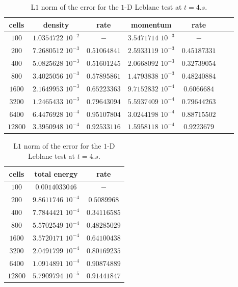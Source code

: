 \documentclass[preprint,10pt]{elsarticle}
\begin{document}
\begin{table}[H]
\begin{center}
 \caption{\label{tbl:l1_norm_leblanc} L$1$ norm of the error for the $1$-D Leblanc test at $t=4.s$.}
 \begin{tabular}{|c|c|c|c|c|c|c|}
 \hline
   cells & density & rate & momentum & rate \\
 \hline
$100$ &   $1.0354722$ $10^{-2}$ & $-$ & $3.5471714$ $10^{-3}$ & $-$ \\
  \hline
$200$  &  $7.2680512$ $10^{-3}$ & $0.51064841$ & $2.5933119$ $10^{-3}$ & $0.45187331$ \\
   \hline
$400$ & $5.0825628$ $10^{-3}$   & $0.51601245$ & $2.0668092$ $10^{-3}$ & $0.32739054$ \\
 \hline
$800$ & $3.4025056$ $10^{-3}$   & $0.57895861$ & $1.4793838$ $10^{-3}$ & $0.48240884$ \\
 \hline
$1600$ & $2.1649953$ $10^{-3}$  & $0.65223363$ & $9.7152832$ $10^{-4}$ & $0.6066684$ \\
 \hline
$3200$&$1.2465433$ $10^{-3}$    & $0.79643094$ & $5.5937409$ $10^{-4}$ & $0.79644263$ \\
 \hline
$6400$& $6.4476928$ $10^{-4}$    & $0.95107804$ & $3.0244198$ $10^{-4}$ & $0.88715502$ \\
 \hline
 $12800$&$3.3950948$ $10^{-4}$  & $0.92533116$ & $1.5958118$ $10^{-4}$ & $0.9223679$ \\
 \hline
 \end{tabular}
 \begin{tabular}{|c|c|c|}
\hline
cells & total energy & rate \\ \hline
 $100$ & $0.0014033046$                   & $-$\\ \hline
  $200$  & $9.8611746$ $10^{-4}$& $0.5089968$\\ \hline
  $400$ & $7.7844421$ $10^{-4}$ & $0.34116585$\\ \hline
  $800$ & $5.5702549$ $10^{-4}$ & $0.48285029$\\ \hline
  $1600$ & $3.5720171$ $10^{-4}$ & $0.64100438$\\ \hline
  $3200$ & $2.0491799$ $10^{-4}$ & $0.80169235$\\ \hline
  $6400$ & $1.0914891$ $10^{-4}$ & $0.90874889$\\ \hline
   $12800$&$5.7909794$ $10^{-5}$ & $0.91441847$\\ \hline
\end{tabular}
\end{center}
\nonumber
\end{table}
\end{document}
